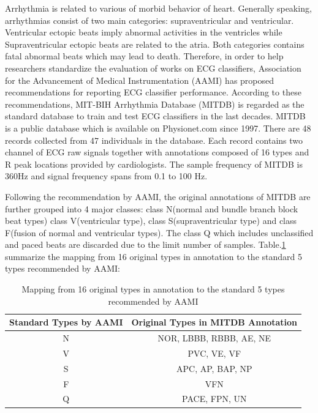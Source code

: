 Arrhythmia is related to various of morbid behavior of heart. Generally speaking, arrhythmias consist of two main categories: supraventricular and ventricular. Ventricular ectopic beats imply abnormal activities in the ventricles while Supraventricular ectopic beats are related to the atria. Both categories contains fatal abnormal beats which may lead to death. Therefore, in order to help researchers standardize the evaluation of works on ECG classifiers, Association for the Advancement of Medical Instrumentation (AAMI) \cite{aami} has proposed recommendations for reporting ECG classifier performance. 
According to these recommendations, MIT-BIH Arrhythmia Database (MITDB) is regarded as the standard database to train and test ECG classifiers in the last decades. MITDB is a public database which is available on Physionet.com \cite{physionet} since 1997\cite{mitdb}. There are 48 records collected from 47 individuals in the database. Each record contains two channel of ECG raw signals together with annotations composed of 16 types and R peak locations provided by cardiologists. The sample frequency of MITDB is 360Hz and signal frequency spans from 0.1 to 100 Hz. 

Following the recommendation by AAMI, the original annotations of MITDB are further grouped into 4 major classes: class N(normal and bundle branch block beat types) class V(ventricular type), class S(supraventricular type) and class F(fusion of normal and ventricular types). The class Q which includes unclassified and paced beats are discarded due to the limit number of samples. Table.\ref{table:grouping_types} summarize the mapping from 16 original types in annotation to the standard 5 types recommended by AAMI:

\begin{table}[h]
\centering
\caption{Mapping from 16 original types in annotation to the standard 5 types recommended by AAMI}
\label{table:grouping_types}
\begin{tabular}{|c|c|}
\hline
Standard Types by AAMI & Original Types in MITDB Annotation \\ \hline
N                      & NOR, LBBB, RBBB, AE, NE            \\ \hline
V                      & PVC, VE, VF                        \\ \hline
S                      & APC, AP, BAP, NP                   \\ \hline
F                      & VFN                                \\ \hline
Q                      & PACE, FPN, UN                      \\ \hline
\end{tabular}
\end{table}



